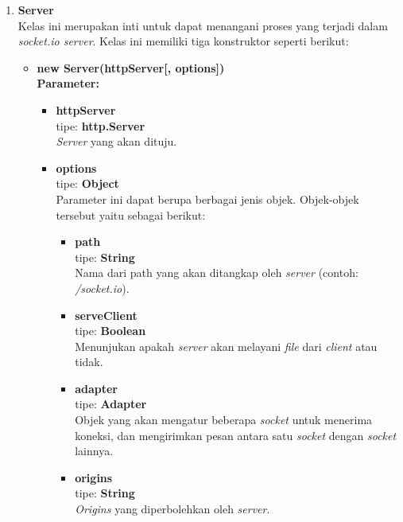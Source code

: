 \begin{enumerate}
	\item \textbf{Server} \\ Kelas ini merupakan inti untuk dapat menangani proses yang terjadi dalam \textit{socket.io server}. Kelas ini memiliki tiga konstruktor seperti berikut: 
	\begin{itemize}
		\item \textbf{new Server(httpServer[, options])} \\ 
		\textbf{Parameter:}
		\begin{itemize}
			\item \textbf{httpServer} \\ tipe: \textbf{http.Server} \\ \textit{Server} yang akan dituju.
			\item \textbf{options} \\ tipe: \textbf{Object} \\ Parameter ini dapat berupa berbagai jenis objek. Objek-objek tersebut yaitu sebagai berikut: 
			\begin{itemize}
				\item \textbf{path} \\ tipe: \textbf{String} \\ Nama dari path yang akan ditangkap oleh \textit{server} (contoh: \textit{/socket.io}).
				
				\item \textbf{serveClient} \\ tipe: \textbf{Boolean} \\ Menunjukan apakah \textit{server} akan melayani \textit{file} dari \textit{client} atau tidak.
				
				\item \textbf{adapter} \\ tipe: \textbf{Adapter} \\ Objek yang akan mengatur beberapa \textit{socket} untuk menerima koneksi, dan mengirimkan pesan antara satu \textit{socket} dengan \textit{socket} lainnya.
				
				\item \textbf{origins} \\ tipe: \textbf{String} \\ \textit{Origins} yang diperbolehkan oleh \textit{server}.
				
			\end{itemize}
		\end{itemize}
	

\end{itemize}
\end{enumerate}
